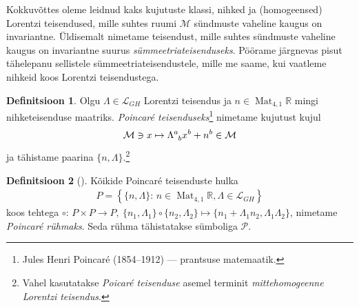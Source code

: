 \documentclass[12pt,a4paper,oneside]{article}
\theoremstyle{plain}
\theoremstyle{definition}
\newtheorem{definitsioon}{Definitsioon}[section]
\numberwithin{equation}{section}
\def\R{{\mathbb R}}
\def\L{{\mathcal L}}
\def\M{{\mathcal M}}
\def\P{{\mathcal P}}
\DeclareMathOperator{\Mat}{Mat}
\begin{document}
Kokkuvõttes oleme leidnud kaks kujutuste klassi, nihked ja 
(homogeensed) \mbox{Lorentzi} teisendused, mille suhtes ruumi $\M$ 
sündmuste vaheline kaugus on invariantne. Üldisemalt nimetame 
teisendust, mille suhtes sündmuste vaheline kaugus on invariantne 
suurus \emph{sümmeetriateisenduseks}. Pöörame järgnevas pisut 
tähele\-panu sellistele sümmeetria\-teisendustele, mille me saame, kui 
vaatleme nihkeid koos Lorentzi teisendustega.

\begin{definitsioon}
Olgu $\Lambda \in \L_{GH}$ Lorentzi teisendus ja 
$n \in \Mat_{4, 1}\R$ mingi nihke\-teisenduse maatriks. 
\emph{Poincar\'e teisenduseks}\footnote{Jules Henri Poincaré 
(1854--1912) --- prantsuse matemaatik.} nimetame kujutust kujul
\begin{align*}
\M \ni x \mapsto \Lambda\indices{^a_b} x^b + n^b \in \M
\end{align*}
ja tähistame paarina $\{n, \Lambda\}$.\footnote{Vahel 
kasutatakse \emph{Poicar\'e teisenduse} asemel terminit 
\emph{mittehomogeenne Lorentzi teisendus}.}
\end{definitsioon}

\begin{definitsioon} [\textnormal{\cite{Barut}}]
Kõikide Poincar\'e teisenduste hulka
\begin{align*}
P = \left\lbrace \{n, \Lambda\} \colon\, n \in \Mat_{4, 1}\R, \Lambda \in 
\L_{GH} \right\rbrace
\end{align*}
koos tehtega $\circ \colon\, P \times P \rightarrow P,\ \{n_1, \Lambda_1\} 
\circ \{n_2, \Lambda_2\} \mapsto \{n_1 + \Lambda_1 n_2, \Lambda_1 
\Lambda_2\}$, nimetame \emph{Poincar\'e rühmaks}. Seda rühma 
tähistatakse sümboliga $\P$.
\end{definitsioon}
\end{document}
